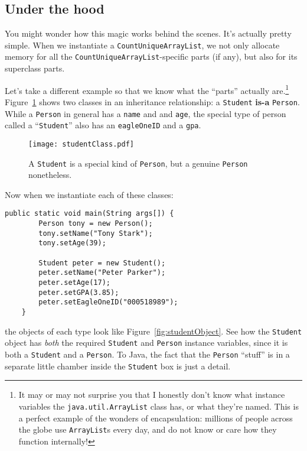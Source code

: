 \subsection{Under the hood}

You might wonder how this magic works behind the scenes. It's actually pretty
simple. When we instantiate a \texttt{CountUniqueArrayList}, we not only
allocate memory for all the \texttt{CountUniqueArrayList}-specific parts (if
any), but also for its superclass parts.

Let's take a different example so that we know what the ``parts'' actually
are.\footnote{It may or may not surprise you that I honestly don't know what
instance variables the \texttt{java.util.ArrayList} class has, or what they're
named. This is a perfect example of the wonders of encapsulation: millions of
people across the globe use \texttt{ArrayList}s every day, and do not know or
care how they function internally!} Figure~\ref{fig:studentClass} shows two
classes in an inheritance relationship: a \texttt{Student} \textbf{is-a}
\texttt{Person}. While a \texttt{Person} in general has a \texttt{name} and 
and \texttt{age}, the special type of person called a ``\texttt{Student}'' also
has an \texttt{eagleOneID} and a \texttt{gpa}.

\begin{figure}
\centering
\texttt{[image: studentClass.pdf]}
\caption{A \texttt{Student} is a special kind of \texttt{Person}, but a
genuine \texttt{Person} nonetheless.}
\label{fig:studentClass}
\end{figure}

\begin{samepage}
Now when we instantiate each of these classes:

\begin{Verbatim}[fontsize=\footnotesize,samepage=true,frame=single]
    public static void main(String args[]) {
        Person tony = new Person();
        tony.setName("Tony Stark");
        tony.setAge(39);

        Student peter = new Student();
        peter.setName("Peter Parker");
        peter.setAge(17);
        peter.setGPA(3.85);
        peter.setEagleOneID("000518989");
    }
\end{Verbatim}
\end{samepage}

the objects of each type look like Figure~\ref{fig:studentObject}. See how the
\texttt{Student} object has \textit{both} the required \texttt{Student} and
\texttt{Person} instance variables, since it is both a \texttt{Student} and a
\texttt{Person}. To Java, the fact that the \texttt{Person} ``stuff'' is in a
separate little chamber inside the \texttt{Student} box is just a detail.

